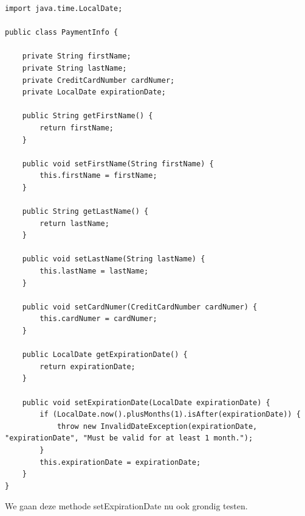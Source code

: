 \documentclass{tstextbook}
\begin{document}
\begin{lstlisting}
import java.time.LocalDate;

public class PaymentInfo {

	private String firstName;
	private String lastName;
	private CreditCardNumber cardNumer;
	private LocalDate expirationDate;

	public String getFirstName() {
		return firstName;
	}

	public void setFirstName(String firstName) {
		this.firstName = firstName;
	}

	public String getLastName() {
		return lastName;
	}

	public void setLastName(String lastName) {
		this.lastName = lastName;
	}

	public void setCardNumer(CreditCardNumber cardNumer) {
		this.cardNumer = cardNumer;
	}

	public LocalDate getExpirationDate() {
		return expirationDate;
	}

	public void setExpirationDate(LocalDate expirationDate) {
		if (LocalDate.now().plusMonths(1).isAfter(expirationDate)) {
			throw new InvalidDateException(expirationDate, "expirationDate", "Must be valid for at least 1 month.");
		}
		this.expirationDate = expirationDate;
	}
}
\end{lstlisting}

We gaan deze  methode setExpirationDate nu ook grondig testen.
\end{document}
